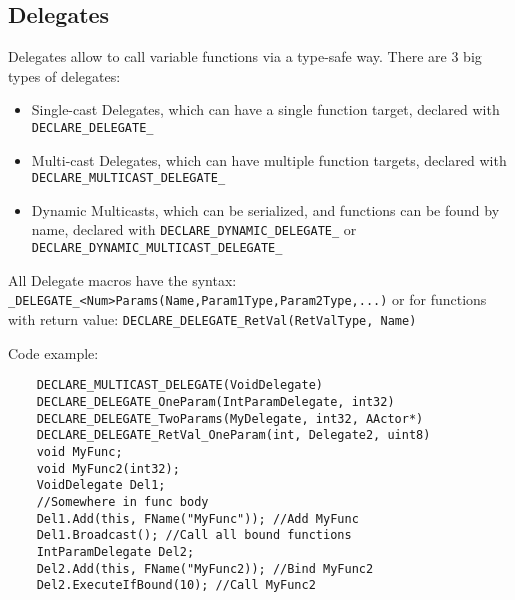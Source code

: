 \documentclass[10pt]{article}
\begin{document}
\begin{multicols*}{5}
	\subsection{Delegates}
	Delegates allow to call variable functions via a type-safe way.
	There are 3 big types of delegates:
	\begin{itemize}
		\item Single-cast Delegates, which can have a single function target, declared with \verb|DECLARE_DELEGATE_|
		\item Multi-cast Delegates, which can have multiple function targets, declared with \verb|DECLARE_MULTICAST_DELEGATE_|
		\item Dynamic Multicasts, which can be serialized, and functions can be found by name, declared with \verb|DECLARE_DYNAMIC_DELEGATE_| or \verb|DECLARE_DYNAMIC_MULTICAST_DELEGATE_|
	\end{itemize}
	All Delegate macros have the syntax: \linebreak \verb|_DELEGATE_<Num>Params(Name,Param1Type,Param2Type,...)|
	or for functions with return value: \linebreak
	\verb|DECLARE_DELEGATE_RetVal(RetValType, Name)|
	
	Code example:
	
	\begin{verbatim}
	DECLARE_MULTICAST_DELEGATE(VoidDelegate)
	DECLARE_DELEGATE_OneParam(IntParamDelegate, int32)
	DECLARE_DELEGATE_TwoParams(MyDelegate, int32, AActor*)
	DECLARE_DELEGATE_RetVal_OneParam(int, Delegate2, uint8)
	void MyFunc;
	void MyFunc2(int32);
	VoidDelegate Del1;
	//Somewhere in func body
	Del1.Add(this, FName("MyFunc")); //Add MyFunc
	Del1.Broadcast(); //Call all bound functions
	IntParamDelegate Del2;
	Del2.Add(this, FName("MyFunc2)); //Bind MyFunc2
	Del2.ExecuteIfBound(10); //Call MyFunc2
	\end{verbatim}
	

\end{multicols*}
\end{document}
